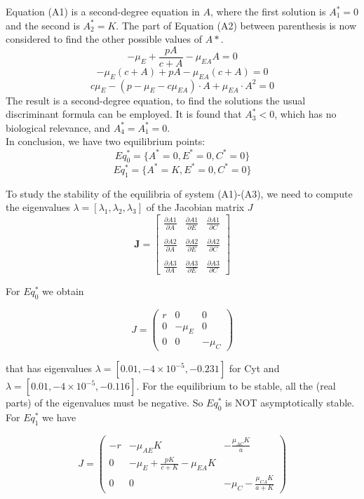 Equation (A1) is a second-degree equation in $A$, where the first solution is $A^*_1=0$ and the second is $A^*_2=K$. The part of Equation (A2) between parenthesis is now considered to find the other possible values of $A*$.
\[ -\mu_E + \frac{pA}{c+A} - \mu_{EA}A = 0 \]
\[ -\mu_E(c+A) + pA - \mu_{EA}(c+A) = 0\]
\[c\mu_E - (p -\mu_E - c\mu_{EA})\cdot A + \mu_{EA}\cdot A^2 = 0\]
The result is a second-degree equation, to find the solutions the usual discriminant formula can be employed. It is found that $A^*_3 < 0$, which has no biological relevance, and $A^*_4 = A^*_1 = 0$.\\
In conclusion, we have two equilibrium points: 
\[Eq_0^* = \{A^* = 0, E^* = 0, C^* = 0\}\]
\[Eq_1^* = \{A^* = K, E^* = 0, C^* = 0\}\]

To study the stability of the equilibria of system (A1)-(A3), we need to compute the eigenvalues $\lambda = [\lambda_1,\lambda_2,\lambda_3]$ of the Jacobian matrix $J$
\[ \mathbf{J} = \begin{bmatrix} \frac{\partial A1}{\partial A} & \frac{\partial A1}{\partial E} & \frac{\partial A1}{\partial C} \\ \\
\frac{\partial A2}{\partial A} & \frac{\partial A2}{\partial E} & \frac{\partial A2}{\partial C}\\ \\
\frac{\partial A3}{\partial A} & \frac{\partial A3}{\partial E} & \frac{\partial A3}{\partial C} \end{bmatrix} \]

For $Eq_0^*$ we obtain

\[ J = \begin{pmatrix} r&0&0 \\ 0&-\mu_E&0 \\ 0&0&-\mu_C \end{pmatrix} \]

that has eigenvalues $\lambda = [0.01,-4\times 10^{-5},-0.231]$ for Cyt and $\lambda = [0.01,-4\times 10^{-5},-0.116]$. For the equilibrium to be stable, all the (real parts) of the eigenvalues must be negative. So $Eq_0^*$ is NOT asymptotically stable.\\

For $Eq_1^*$ we have

\[ J = \begin{pmatrix} -r & -\mu_{AE}K & -\frac{\mu_{AC}K}{a} \\ 0 & -\mu_E + \frac{pK}{c+K} - \mu_{EA}K \\ 0&0& -\mu_C - \frac{\mu_{CA}K}{a+K} \end{pmatrix} \]

